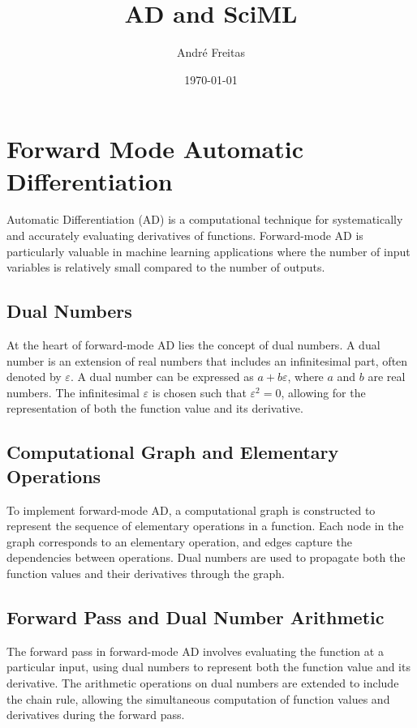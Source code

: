 \documentclass[hidelinks]{article}
\title{AD and SciML}
\author{André Freitas}
\date{\today}
\begin{document}
\maketitle

\section{Forward Mode Automatic Differentiation}

Automatic Differentiation (AD) is a computational technique for systematically and accurately evaluating derivatives of functions. Forward-mode AD is particularly valuable in machine learning applications where the number of input variables is relatively small compared to the number of outputs.

\subsection{Dual Numbers}

At the heart of forward-mode AD lies the concept of dual numbers. A dual number is an extension of real numbers that includes an infinitesimal part, often denoted by $\varepsilon$. A dual number can be expressed as $a + b \varepsilon$, where $a$ and $b$ are real numbers. The infinitesimal $\varepsilon$ is chosen such that $\varepsilon^2 = 0$, allowing for the representation of both the function value and its derivative.

\subsection{Computational Graph and Elementary Operations}

To implement forward-mode AD, a computational graph is constructed to represent the sequence of elementary operations in a function. Each node in the graph corresponds to an elementary operation, and edges capture the dependencies between operations. Dual numbers are used to propagate both the function values and their derivatives through the graph.

\subsection{Forward Pass and Dual Number Arithmetic}

The forward pass in forward-mode AD involves evaluating the function at a particular input, using dual numbers to represent both the function value and its derivative. The arithmetic operations on dual numbers are extended to include the chain rule, allowing the simultaneous computation of function values and derivatives during the forward pass.
\end{document}
